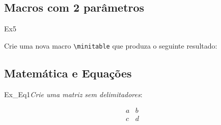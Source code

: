 \subsection*{Macros com 2 parâmetros}
\label{sec:exec_macros_2_par}

\begin{texercise}{Ex5}
\begin{tcboutputlisting}
\newcommand{\minitable}[2]{%
    \begin{center}\begin{tabular}{p{10cm}}\hline%
    \multicolumn{1}{c}{\bfseries#1}\\\hline%
    #2\\\hline%
    \end{tabular}\end{center}}
    \end{tcboutputlisting}
    \tcbuselistingtext%
    Crie uma nova macro \verb+\minitable+ que produza o seguinte resultado:\par\smallskip\begin{tcbwritetemp}
    \end{tcbwritetemp}
    \tcbusetemplisting\par\smallskip\tcbusetemp%
\end{texercise}

\subsection*{Matemática e Equações}
\label{sec:exec_mat_eqs}

\begin{texercise}{Ex_Eq1}\textit{Crie uma matriz sem delimitadores}:\par\smallskip%
\begin{tcboutputlisting}
    \begin{center}
        \begin{equation*}
            \begin{matrix} 
                a & b \\ 
                c & d 
            \end{matrix}
        \end{equation*}
    \end{center}
\end{tcboutputlisting}
\tcbuselistingtext%
\end{texercise}

